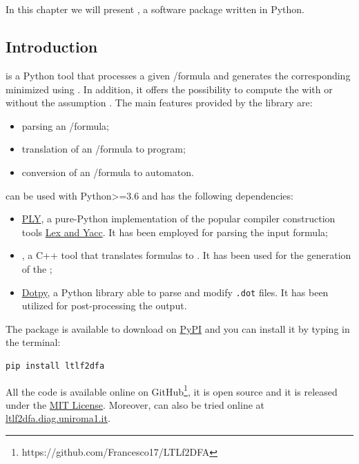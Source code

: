 \chapter{\LTLfToDFA}\label{ch:ltlf2dfa}
In this chapter we will present \href{https://github.com/Francesco17/LTLf2DFA}{\LTLfToDFA}, a software package  written in Python. 

\section{Introduction}\label{sec:intro}
\LTLfToDFA is a Python tool that processes a given \LTLf/\PLTL formula and generates the corresponding minimized \DFA using \MONA\citep{mona1998}. In addition, it offers the possibility to compute the \DFA with or without the \declare assumption \citep{DeGiacomo:2014:RLF:2893873.2894033}.
The main features provided by the library are:
\begin{itemize}
\item parsing an \LTLf/\PLTL formula;
\item translation of an \LTLf/\PLTL formula to \MONA program;
\item conversion of an \LTLf/\PLTL formula to \DFA automaton.
\end{itemize}
\LTLfToDFA can be used with Python>=3.6 and has the following dependencies:
\begin{itemize}
\item \href{http://www.dabeaz.com/ply/ply.html}{PLY}, a pure-Python implementation of the popular compiler construction tools \href{http://dinosaur.compilertools.net/}{Lex and Yacc}. It has been employed for parsing the input \LTLf formula;
\item \href{http://www.brics.dk/mona/}{\MONA}, a C++ tool that translates formulas to \DFA. It has been used for the generation of the \DFA;
\item \href{https://pypi.org/project/dotpy/}{Dotpy}, a Python library able to parse and modify \texttt{.dot} files. It has been utilized for post-processing the \MONA output.
\end{itemize}
The package is available to download on \href{https://pypi.org/project/ltlf2dfa/}{PyPI} and you can install it by typing in the terminal:
\begin{lstlisting}[language=bash]
pip install ltlf2dfa
\end{lstlisting}
All the code is available online on GitHub\footnote{https://github.com/Francesco17/LTLf2DFA}, it is open source and it is released under the \href{https://github.com/Francesco17/LTLf2DFA/blob/master/LICENSE}{MIT License}.
Moreover, \LTLfToDFA can also be tried online at \href{ltlf2dfa.diag.uniroma1.it}{ltlf2dfa.diag.uniroma1.it}.

